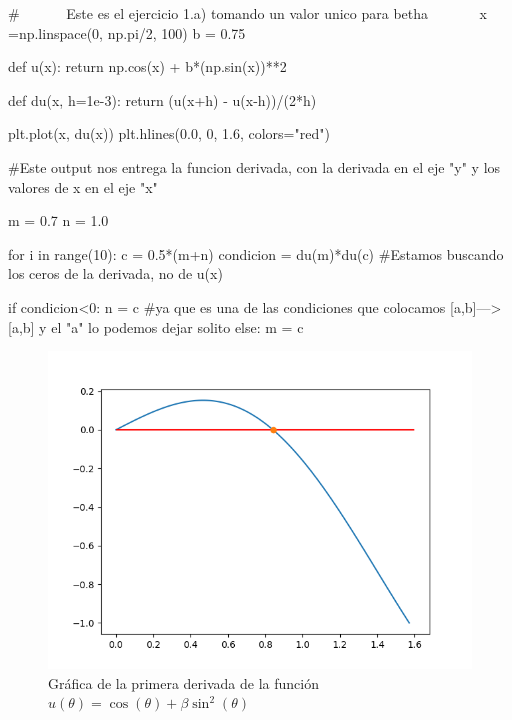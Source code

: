 \documentclass[../portafolio.tex]{subfiles}
\begin{document}
	\begin{listing}
		\begin{pythoncode}
# ~~~~~~Este es el ejercicio 1.a) tomando un valor unico para betha ~~~~~~
x =np.linspace(0, np.pi/2, 100)  
b = 0.75

def u(x):
    return np.cos(x) + b*(np.sin(x))**2

def du(x, h=1e-3):
    return (u(x+h) - u(x-h))/(2*h)

plt.plot(x, du(x))
plt.hlines(0.0, 0, 1.6, colors="red")

#Este output nos entrega la funcion derivada, con la derivada en el eje "y" y los valores de x en el eje "x"

m = 0.7
n = 1.0

for i in range(10):
    c = 0.5*(m+n)
    condicion = du(m)*du(c) #Estamos buscando los ceros de la derivada, no de u(x)

    if condicion<0: 
        n = c #ya que es una de las condiciones que colocamos [a,b]---> [a,b] y el "a" lo podemos dejar solito
    else:
        m = c
		\end{pythoncode}
		\caption{Codigo utilizado para graficar la figura \ref{img:graphceros}}
		\label{code:ceros}
	\end{listing}

	\begin{figure}
		\centering
		\includegraphics[scale=0.4]{graph-ceros.png}
		\caption{Gr\'afica de la primera derivada de la funci\'on $u(\theta) = \cos (\theta) + \beta \sin^2 (\theta)$}
		\label{img:graphceros}
	\end{figure}
\end{document}
